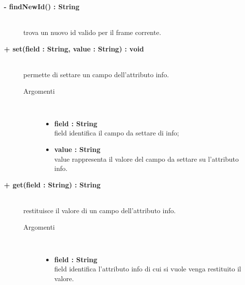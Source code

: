 \begin{description}
	\begin{description}
		\item[\textbf{- findNewId() : String			}] \hfill \\
			trova un nuovo id valido per il frame corrente.

\end{description}

	\begin{description}
		\item[\textbf{+ set(field : String, value : String) : void			}] \hfill \\
			permette di settare un campo dell'attributo info.
			
		\begin{description}
			\item[Argomenti] \hfill \\
				\begin{itemize}
				
					\item \textbf{field : String			} \hfill \\
					field identifica il campo da settare di info;
					\item \textbf{value : String			} \hfill \\
					value rappresenta il valore del campo da settare su l'attributo info.
				\end{itemize}
		\end{description}

\end{description}

\begin{description}
		\item[\textbf{+ get(field : String) : String			}] \hfill \\
			restituisce il valore di un campo dell'attributo info.
			
		\begin{description}
			\item[Argomenti] \hfill \\
				\begin{itemize}
				
					\item \textbf{field : String			} \hfill \\
					field identifica l'attributo info di cui si vuole venga restituito il valore.
				\end{itemize}
		\end{description}


\end{description}
\end{description}
